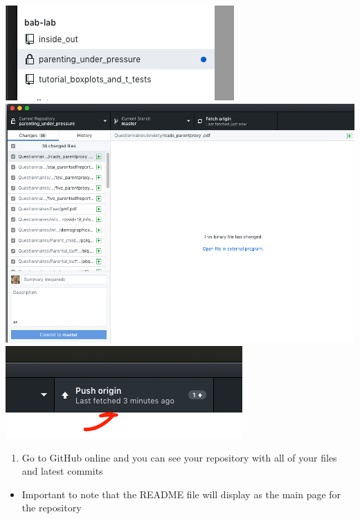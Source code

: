 \documentclass[]{book}
\providecommand{\tightlist}{%
  \setlength{\itemsep}{0pt}\setlength{\parskip}{0pt}}
\begin{document}
\includegraphics{images/research_protocols/github/9.png}
\includegraphics{images/research_protocols/github/10.png}
\includegraphics{images/research_protocols/github/12.png}

\begin{enumerate}
\def\labelenumi{\arabic{enumi}.}
\setcounter{enumi}{8}
\tightlist
\item
  Go to GitHub online and you can see your repository with all of your files and latest commits
\end{enumerate}

\begin{itemize}
\tightlist
\item
  Important to note that the README file will display as the main page for the repository
\end{itemize}
\end{document}
